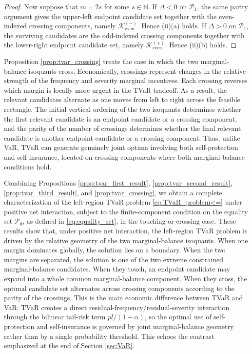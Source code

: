\documentclass[a4paper,12pt]{article}
\begin{document}
\begin{proof}
Now suppose that $m=2s$ for some $s\in\mathbb{N}$. If $\Delta<0$ on $\mathcal{P}_1$, the same parity argument gives the upper-left endpoint candidate set together with the even-indexed crossing components, namely $\mathcal{K}_{\text{even}}^{\left(-\right)}$. Hence (ii)(a) holds. If $\Delta>0$ on $\mathcal{P}_1$, the surviving candidates are the odd-indexed crossing components together with the lower-right endpoint candidate set, namely $\mathcal{K}_{\text{even}}^{\left(+\right)}$. Hence (ii)(b) holds.
\end{proof}

Proposition \ref{prop:tvar_crossing} treats the case in which the two marginal-balance isoquants cross. Economically, crossings represent changes in the relative strength of the frequency and severity marginal incentives. Each crossing reverses which margin is locally more urgent in the TVaR tradeoff. As a result, the relevant candidates alternate as one moves from left to right across the feasible rectangle. The initial vertical ordering of the two isoquants determines whether the first relevant candidate is an endpoint candidate or a crossing component, and the parity of the number of crossings determines whether the final relevant candidate is another endpoint candidate or a crossing component. Thus, unlike VaR, TVaR can generate genuinely joint optima involving both self-protection and self-insurance, located on crossing components where both marginal-balance conditions hold.

Combining Propositions \ref{prop:tvar_first_result}, \ref{prop:tvar_second_result}, \ref{prop:tvar_third_result}, and \ref{prop:tvar_crossing}, we obtain a complete characterization of the left-region TVaR problem \eqref{eq:TVaR_problem<=} under positive net interaction, subject to the finite-component condition on the equality set $\mathcal{P}_0$, as defined in \eqref{eq:equality_set}, in the touching-or-crossing case. These results show that, under positive net interaction, the left-region TVaR problem is driven by the relative geometry of the two marginal-balance isoquants. When one margin dominates globally, the solution lies on a boundary. When the two margins are separated, the solution is one of the two extreme constrained marginal-balance candidates. When they touch, an endpoint candidate may expand into a whole common marginal-balance component. When they cross, the optimal candidate set alternates across crossing components according to the parity of the crossings. This is the main economic difference between TVaR and VaR: TVaR creates a direct residual-frequency/residual-severity interaction through the bilinear tail-risk term $pl/\left(1-\alpha\right)$, so the optimal use of self-protection and self-insurance is governed by joint marginal-balance geometry rather than by a single probability threshold. This echoes the contrast emphasized at the end of Section \ref{sec:VaR}.
\end{document}
